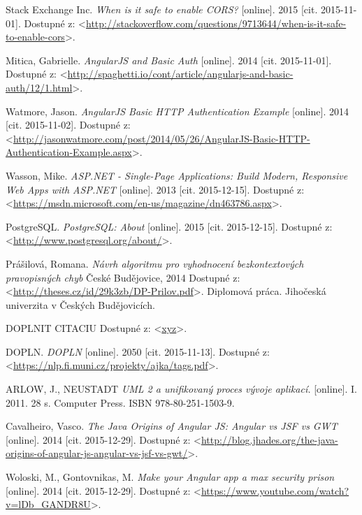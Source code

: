 \documentclass[12pt,oneside]{fithesis2}
\begin{document}
\begin{thebibliography}{59}
  		Stack Exchange Inc.
  		\emph{When is it safe to enable CORS?}
  		[online].
  		2015
  		[cit. 2015-11-01].
  		Dostupné z: <\url{http://stackoverflow.com/questions/9713644/when-is-it-safe-to-enable-cors}>.
  		
  		Mitica, Gabrielle.
  		\emph{AngularJS and Basic Auth}
  		[online].
  		2014
  		[cit. 2015-11-01].
  		Dostupné z: <\url{http://spaghetti.io/cont/article/angularjs-and-basic-auth/12/1.html}>.
  		
  		Watmore, Jason.
  		\emph{AngularJS Basic HTTP Authentication Example}
  		[online].
  		2014
  		[cit. 2015-11-02].
  		Dostupné z: <\url{http://jasonwatmore.com/post/2014/05/26/AngularJS-Basic-HTTP-Authentication-Example.aspx}>.
  		
  		Wasson, Mike.
  		\emph{ASP.NET - Single-Page Applications: Build Modern, Responsive Web Apps with ASP.NET}
  		[online].
  		2013
  		[cit. 2015-12-15].
  		Dostupné z: <\url{https://msdn.microsoft.com/en-us/magazine/dn463786.aspx}>.
  		
  		PostgreSQL.
  		\emph{PostgreSQL: About}
  		[online].
  		2015
  		[cit. 2015-12-15].
  		Dostupné z: <\url{http://www.postgresql.org/about/}>.
  		
  		Prášilová, Romana.
  		\emph{Návrh algoritmu pro vyhodnocení bezkontextových pravopisných chyb}
  		České Budějovice, 
  		2014
  		Dostupné z: <\url{http://theses.cz/id/29k3zb/DP-Prilov.pdf}>.
  		Diplomová práca. Jihočeská univerzita v Českých Budějovicích.
  		
		DOPLNIT CITACIU
  		Dostupné z: <\url{xyz}>.
  		
  		DOPLN.
  		\emph{DOPLN}
  		[online].
  		2050
  		[cit. 2015-11-13].
  		Dostupné z: <\url{https://nlp.fi.muni.cz/projekty/ajka/tags.pdf}>.
  		
  		ARLOW, J., NEUSTADT
  		\emph{UML 2 a unifikovaný proces vývoje aplikací.}
  		[online].
  		I. 2011. 28 s.
		Computer Press. ISBN 978-80-251-1503-9. 
  		
  		Cavalheiro, Vasco.
  		\emph{The Java Origins of Angular JS: Angular vs JSF vs GWT}
  		[online].
  		2014
  		[cit. 2015-12-29].
  		Dostupné z: <\url{http://blog.jhades.org/the-java-origins-of-angular-js-angular-vs-jsf-vs-gwt/}>.
  		
  		Woloski, M., Gontovnikas, M.
  		\emph{Make your Angular app a max security prison}
  		[online].
  		2014
  		[cit. 2015-12-29].
  		Dostupné z: <\url{https://www.youtube.com/watch?v=lDb_GANDR8U}>.
  		

\end{thebibliography}
\end{document}

